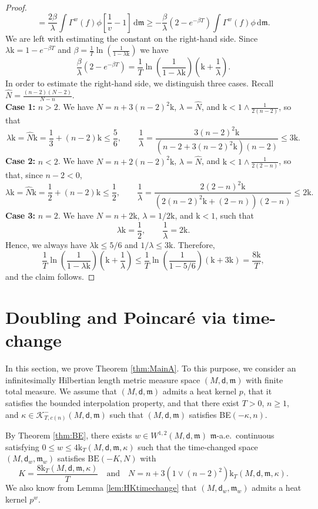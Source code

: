 \documentclass[10pt]{article}
\newcommand{\K}{\mathscr{K}}
\newcommand{\m}{\mathfrak{m}}
\newcommand{\M}{{\mathit{M}}}
\renewcommand{\d}{\,\mathrm{d}}
\renewcommand{\k}{\mathrm{k}}
\newcommand{\dist}{\mathsf{d}}
\theoremstyle{plain}
\theoremstyle{definition}
\newcommand{\Sob}{W^{1,2}(M,\dist,\m)}
\begin{document}
\begin{proof}
\[=
\frac{2\beta}\lambda\int \Gamma^w(f)\phi\left[\frac{1}v-1\right]\d \m
\geq -\frac{\beta}\lambda (2-e^{-\beta T})
\int \Gamma^w(f)\phi\d \m.
\]
We are left with estimating the constant on the right-hand side. 
Since  $\lambda \k=1-e^{-\beta T}$ and $\beta= \frac{1}T\ln\left(\frac1{1-\lambda\k} \right)$ we have
\[
\frac{\beta}\lambda (2-e^{-\beta T})
= \frac{1}T\ln\left(\frac1{1-\lambda\k} \right)\left(\k+\frac{1}{\lambda}\right).
\]
In order to estimate the right-hand side, we  distinguish three cases. Recall $\hat N=\tfrac{(n-2)(N-2)}{N-n}$.
\\
\textbf{Case 1:} $n>2$. We have $N=n+3(n-2)^2\k$, $\lambda=\hat N$, and $\k< 1\wedge \tfrac{1}{2(n-2)}$, so that 
\[
\lambda \k=\hat N\k
=
\frac{1}{3}+(n-2)\k\leq \frac{5}{6},\qquad \frac{1}{\lambda}=\frac{3(n-2)^2\k}{(n-2+3(n-2)^2\k)(n-2)}\le 3\k.
\]
\textbf{Case 2:} $n<2$. We have $N=n+2(n-2)^2\k$, $\lambda=\hat N$, and $\k<1\wedge \tfrac{1}{2(2-n)}$, so that, since $n-2<0$,
\[
\lambda \k=\hat N\k
=
\frac{1}{2}+(n-2)\k\leq \frac{1}{2},\qquad \frac{1}{\lambda}=\frac{2(2-n)^2\k}{(2(n-2)^2\k+(2-n))(2-n)}\le 2\k.
\]
\textbf{Case 3:} $n=2$. We have $N=n+2\k$, $\lambda=1/2\k$, and $\k< 1$, such that
\[
\lambda \k=\frac{1}{2},
\qquad \frac{1}{\lambda}= 2\k.
\]
Hence, we always have $\lambda\k\leq 5/6$ and $1/\lambda\leq 3\k$. Therefore,
\[
 \frac{1}T\ln\left(\frac1{1-\lambda\k} \right)\left(\k+\frac{1}{\lambda}\right)
\leq 
\frac{1}T\ln\left(\frac1{1-5/6} \right)\left(\k+3\k\right)
=\frac{8\k}{T},
\]
and the claim follows.
\end{proof}










\section{Doubling and Poincaré via time-change}

In this section, we prove Theorem \ref{thm:MainA}. To this purpose, we  consider an infinitesimally Hilbertian length  metric measure space $(\M,\dist,\m)$ with finite total measure. We assume that $(\M,\dist,\m)$ admits a heat kernel $p$, that it satisfies the bounded interpolation property, and that there exist $T>0$, $n \ge 1$, and $\kappa \in \K^-_{T,c(n)}(\M,\dist,\m)$ such that $(M,\dist,\m)$ satisfies BE$(-\kappa,n)$.

By Theorem \ref{thm:BE}, there exists $w \in \Sob$ $\m$-a.e.~continuous satisfying $0 \le w \le 4 \k_T(M,\dist,\m,\kappa)$ such that the time-changed space $(M,\dist_w,\m_w)$ satisfies $\mathrm{BE}(-K,N)$ with \[K=\frac{8\k_T(M,\dist,\m,\kappa)}{T}\quad \text{and} \quad  N=n+3(1\vee (n-2)^2) \k_T(M,\dist,\m,\kappa).\] We also know from Lemma \ref{lem:HKtimechange} that $(M,\dist_w,\m_w)$ admits a heat kernel $p^w$.
 
\end{document}
